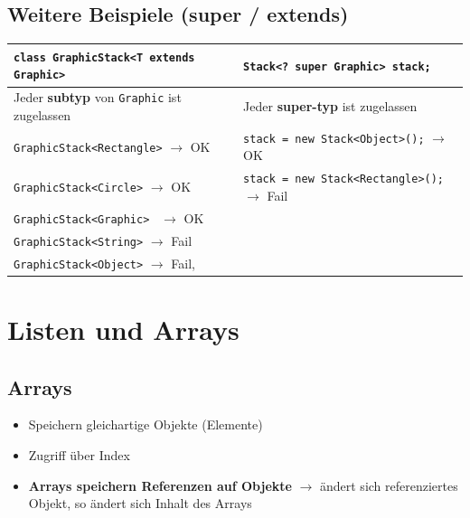 \documentclass[a4paper, landscape, 8pt]{scrartcl}
\begin{document}
\begin{multicols*}{4}
            \subsection{Weitere Beispiele (super / extends)}
                \begin{tabular}{|p{3cm}|p{3cm}|}
                    \hline
                    \texttt{class GraphicStack<T extends Graphic>} & \texttt{Stack<? super Graphic> stack;} \\
                    \hline
                    Jeder {\bfseries subtyp} von \texttt{Graphic} ist zugelassen & Jeder {\bfseries super-typ} ist
                    zugelassen \\
                    \texttt{GraphicStack<Rectangle>} $\to$ OK & \texttt{stack = new Stack<Object>();} $\to$ OK \\
                    \texttt{GraphicStack<Circle>} $\to$ OK & \texttt{stack = new Stack<Rectangle>();} $\to$ Fail \\
                    \texttt{GraphicStack<Graphic> } $\to$ OK & \\
                    \texttt{GraphicStack<String>} $\to$ Fail & \\
                    \texttt{GraphicStack<Object>} $\to$ Fail, & \\
                    \hline
                \end{tabular}

        \section{Listen und Arrays}
            \subsection{Arrays}
                \begin{itemize}
                    \item Speichern gleichartige Objekte (Elemente)
                    \item Zugriff über Index
                    \item {\bfseries Arrays speichern Referenzen auf Objekte} $\to$ ändert sich referenziertes Objekt,
                    so ändert sich Inhalt des Arrays
                \end{itemize}
        

\end{multicols*}
\end{document}
